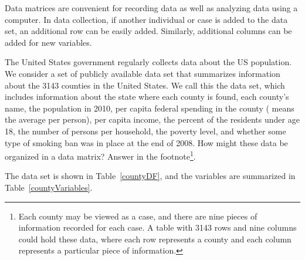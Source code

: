 Data matrices are convenient for recording data as well as analyzing data using a computer. In data collection, if another individual or case is added to the data set, an additional row can be easily added. Similarly, additional columns can be added for new variables.

\begin{exercise}
The United States government regularly collects data about the US population. We consider a set of publicly available data set that summarizes information about the 3143 counties in the United States. We call this the  data set, which includes information about the state where each county is found, each county's name, the population in 2010, per capita federal spending in the county ( means the average per person), per capita income, the percent of the residents under age 18, the number of persons per household, the poverty level, and whether some type of smoking ban was in place at the end of 2008. How might these data be organized in a data matrix? Answer in the footnote\footnote{Each county may be viewed as a case, and there are nine pieces of information recorded for each case. A table with 3143 rows and nine columns could hold these data, where each row represents a county and each column represents a particular piece of information.}.
\end{exercise}

\noindent The  data set is shown in Table~\ref{countyDF}, and the variables are summarized in Table~\ref{countyVariables}.


